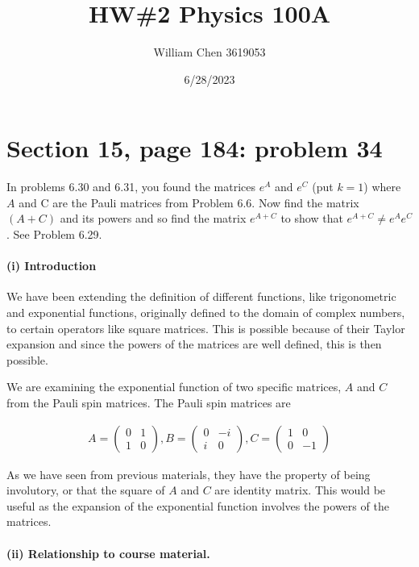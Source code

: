 \documentclass{article}
\title{HW\#2 Physics 100A}
\date{6/28/2023}
\author{William Chen 3619053}
\begin{document}
\maketitle
 
\section*{Section 15, page 184: problem 34}

In problems 6.30 and 6.31, you found the matrices $e^A$ and $e^C$ (put $k = 1$) where $A$
and C are the Pauli matrices from Problem 6.6. Now find the matrix $(A+C)$ and its
powers and so find the matrix $e^{A+C}$ to show that $e^{A+C} \neq e^A e^C$. See Problem 6.29.

\paragraph{(i) Introduction} 

We have been extending the definition of different functions, like trigonometric and exponential functions, originally defined to the domain of complex numbers, to certain operators like square matrices. This is possible because of their Taylor expansion and since the powers of the matrices are well defined, this is then possible.

We are examining the exponential function of two specific matrices, $A$ and $C$ from the Pauli spin matrices. The Pauli spin matrices are

\begin{align*}
A = \begin{pmatrix}
0 & 1 \\ 1 & 0
\end{pmatrix}, 
B = \begin{pmatrix}
0 & -i \\ i & 0
\end{pmatrix},
C = \begin{pmatrix}
1 & 0 \\ 0 & -1
\end{pmatrix}
\end{align*}

As we have seen from previous materials, they have the property of being involutory, or that the square of $A$ and $C$ are identity matrix. This would be useful as the expansion of the exponential function involves the powers of the matrices.

\paragraph{(ii) Relationship to course material.} 
\end{document}
